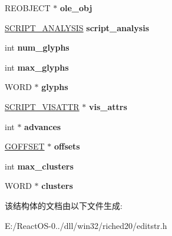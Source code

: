 \begin{DoxyCompactItemize}
\item 
\mbox{\label{structtag_m_e___run_a387d0fd10c4168447f8312aef693d008}} 
R\+E\+O\+B\+J\+E\+CT $\ast$ {\bfseries ole\+\_\+obj}
\item 
\mbox{\label{structtag_m_e___run_a861a13fbb038218f4ba75abcc9d6d83c}} 
\hyperlink{structtag___s_c_r_i_p_t___a_n_a_l_y_s_i_s}{S\+C\+R\+I\+P\+T\+\_\+\+A\+N\+A\+L\+Y\+S\+IS} {\bfseries script\+\_\+analysis}
\item 
\mbox{\label{structtag_m_e___run_a0382e2320dd41be8da8947c9afdec4ec}} 
int {\bfseries num\+\_\+glyphs}
\item 
\mbox{\label{structtag_m_e___run_ad38e3124c008726687dfa15bb8801829}} 
int {\bfseries max\+\_\+glyphs}
\item 
\mbox{\label{structtag_m_e___run_a7381bfa245febb2b4e8707c8117bd269}} 
W\+O\+RD $\ast$ {\bfseries glyphs}
\item 
\mbox{\label{structtag_m_e___run_a4414e83bada92aae7e7d612614c25a69}} 
\hyperlink{structtag___s_c_r_i_p_t___v_i_s_a_t_t_r}{S\+C\+R\+I\+P\+T\+\_\+\+V\+I\+S\+A\+T\+TR} $\ast$ {\bfseries vis\+\_\+attrs}
\item 
\mbox{\label{structtag_m_e___run_a6f64cf85bcded872d8ff521624ef46d1}} 
int $\ast$ {\bfseries advances}
\item 
\mbox{\label{structtag_m_e___run_a1030abb0dfd9d872f8e3ad82d920624a}} 
\hyperlink{structtag_g_o_f_f_s_e_t}{G\+O\+F\+F\+S\+ET} $\ast$ {\bfseries offsets}
\item 
\mbox{\label{structtag_m_e___run_a4c3e5d9d6986fdb7804b82d20bebedb7}} 
int {\bfseries max\+\_\+clusters}
\item 
\mbox{\label{structtag_m_e___run_afbcd3faa2fc462c5d78afe9b0fdfe3c1}} 
W\+O\+RD $\ast$ {\bfseries clusters}
\end{DoxyCompactItemize}


该结构体的文档由以下文件生成\+:\begin{DoxyCompactItemize}
\item 
E\+:/\+React\+O\+S-\/0../dll/win32/riched20/editstr.\+h\end{DoxyCompactItemize}
